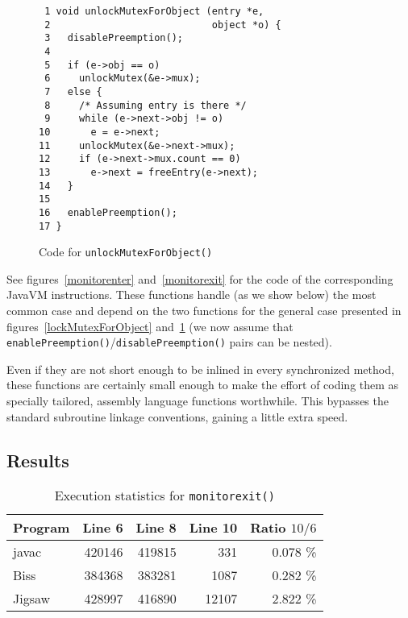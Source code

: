 \begin{figure}
\begin{verbatim}
 1 void unlockMutexForObject (entry *e,
 2                            object *o) {
 3   disablePreemption();
 4 
 5   if (e->obj == o)
 6     unlockMutex(&e->mux);
 7   else {
 8     /* Assuming entry is there */
 9     while (e->next->obj != o)
10       e = e->next;
11     unlockMutex(&e->next->mux);
12     if (e->next->mux.count == 0)
13       e->next = freeEntry(e->next);
14   }
15 
16   enablePreemption();
17 }
\end{verbatim}
\caption{Code for \texttt{unlockMutexForObject()}}
\label{unlockMutexForObject}
\end{figure}

See figures~\ref{monitorenter} and~\ref{monitorexit} for the code of
the corresponding JavaVM instructions. These functions handle (as we
show below) the most common case and depend on the two functions for
the general case presented in figures~\ref{lockMutexForObject}
and~\ref{unlockMutexForObject} (we now assume that
\texttt{enablePreemption()}/\texttt{disablePreemption()} pairs can be
nested).

Even if they are not short enough to be inlined in every synchronized
method, these functions are certainly small enough to make the effort
of coding them as specially tailored, assembly language functions
worthwhile. This bypasses the standard subroutine linkage conventions,
gaining a little extra speed.

\subsection{Results}

\begin{table}
\begin{center}
\begin{tabular}{|l|r|r|r|r|}      %
\hline
Program & Line 6 & Line 8 & Line 10 & Ratio $10/6$ \\ \hline\hline
javac       & 420146 & 419815 & 331     & 0.078 \% \\ \hline
Biss        & 384368 & 383281 & 1087    & 0.282 \% \\ \hline
Jigsaw      & 428997 & 416890 & 12107   & 2.822 \% \\ \hline
\end{tabular}
\caption{Execution statistics for \texttt{monitorexit()}}
\label{monitorExit}
\end{center}
\end{table}

